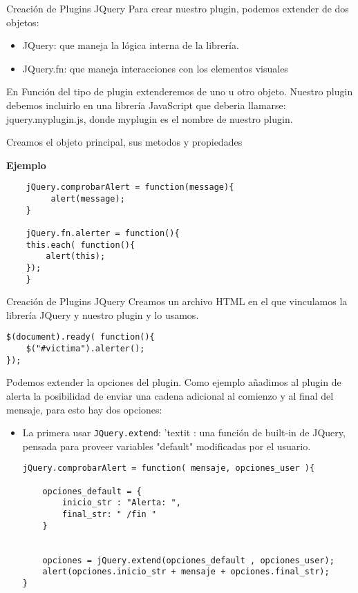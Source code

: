\begin{frame}[fragile]{Creación de Plugins JQuery} %
Para crear nuestro plugin, podemos extender de dos objetos:
\begin{itemize}
\item JQuery: que maneja la lógica interna de la librería.
\item JQuery.fn: que maneja interacciones con los elementos visuales
\end{itemize}
En Función del tipo de plugin extenderemos de uno u otro objeto. Nuestro plugin debemos incluirlo en una librería JavaScript que deberia llamarse: jquery.myplugin.js, donde myplugin es el nombre de nuestro plugin.

Creamos el objeto principal, sus metodos y propiedades

\textbf{Ejemplo}

\begin{lstlisting}
    jQuery.comprobarAlert = function(message){    
         alert(message);    
    }

    jQuery.fn.alerter = function(){
    this.each( function(){
        alert(this);
    });
    }
\end{lstlisting}
\end{frame}

\begin{frame}[fragile]{Creación de Plugins JQuery} %
Creamos un archivo HTML en el que vinculamos la librería JQuery y
nuestro plugin y lo usamos.

\begin{lstlisting}
$(document).ready( function(){
    $("#victima").alerter();
});
\end{lstlisting}

Podemos extender la opciones del plugin. Como ejemplo añadimos al plugin de
alerta la posibilidad de enviar una cadena adicional al comienzo y al final del mensaje, para esto hay dos opciones:
\begin{itemize}
\item La primera usar \texttt{JQuery.extend}: 'textit{ : una función de
built-in de JQuery, pensada para proveer variables "default" modificadas por el usuario.}
\begin{lstlisting}
jQuery.comprobarAlert = function( mensaje, opciones_user ){

    opciones_default = {
        inicio_str : "Alerta: ",
        final_str: " /fin "
    }


    opciones = jQuery.extend(opciones_default , opciones_user);
    alert(opciones.inicio_str + mensaje + opciones.final_str);
}
\end{lstlisting}
\end{itemize}
\end{frame}

